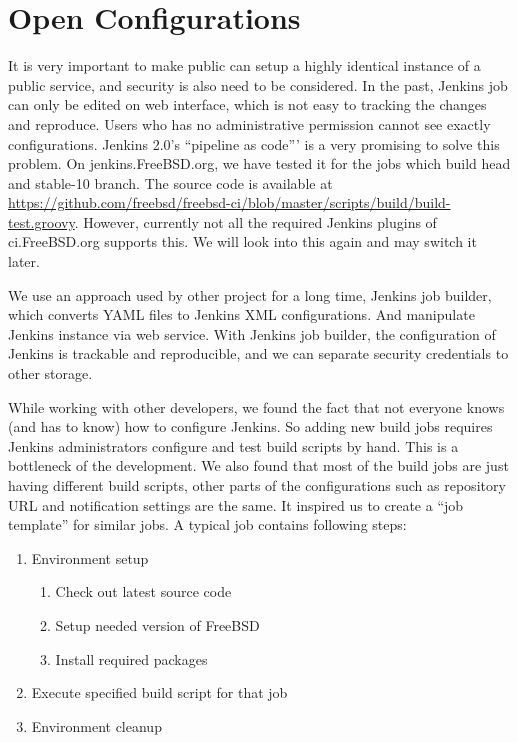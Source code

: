 \documentclass[a4paper,twocolumn,10pt]{article}
\begin{document}
\section{Open Configurations}
It is very important to make public can setup a highly identical instance of a
public service, and security is also need to be considered. In the past,
Jenkins job can only be edited on web interface, which is not easy to tracking
the changes and reproduce. Users who has no administrative permission cannot
see exactly configurations. Jenkins 2.0's ``pipeline as code''' is a very
promising to solve this problem. On jenkins.FreeBSD.org, we have tested it for
the jobs which build head and stable-10 branch. The source code is available at
\url{https://github.com/freebsd/freebsd-ci/blob/master/scripts/build/build-test.groovy}.
However, currently not all the required Jenkins plugins of ci.FreeBSD.org
supports this. We will look into this again and may switch it later.

We use an approach used by other project for a long time, Jenkins job builder,
which converts YAML files to Jenkins XML configurations. And manipulate Jenkins
instance via web service. With Jenkins job builder, the configuration of
Jenkins is trackable and reproducible, and we can separate security credentials
to other storage.

While working with other developers, we found the fact that not everyone knows
(and has to know) how to configure Jenkins. So adding new build jobs requires
Jenkins administrators configure and test build scripts by hand. This is a
bottleneck of the development. We also found that most of the build jobs are
just having different build scripts, other parts of the configurations such as
repository URL and notification settings are the same. It inspired us to create
a ``job template'' for similar jobs. A typical job contains following steps:

\begin{enumerate}
\item Environment setup
  \begin{enumerate}
  \item Check out latest source code
  \item Setup needed version of FreeBSD
  \item Install required packages
  \end{enumerate}
\item Execute specified build script for that job
\item Environment cleanup
\end{enumerate}
\end{document}
